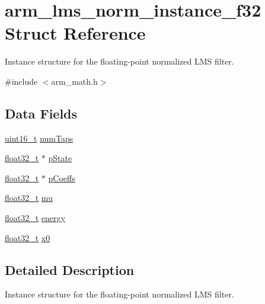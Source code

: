 \hypertarget{structarm__lms__norm__instance__f32}{\section{arm\-\_\-lms\-\_\-norm\-\_\-instance\-\_\-f32 Struct Reference}
\label{structarm__lms__norm__instance__f32}
}


Instance structure for the floating-\/point normalized L\-M\-S filter.  




{\ttfamily \#include $<$arm\-\_\-math.\-h$>$}

\subsection*{Data Fields}
\begin{DoxyCompactItemize}
\item 
\hyperlink{stdint_8h_a273cf69d639a59973b6019625df33e30}{uint16\-\_\-t} \hyperlink{structarm__lms__norm__instance__f32_ac95f8ca3d816524c2070643852fac5e8}{num\-Taps}
\item 
\hyperlink{arm__math_8h_a4611b605e45ab401f02cab15c5e38715}{float32\-\_\-t} $\ast$ \hyperlink{structarm__lms__norm__instance__f32_a0bc03338687002ed5f2e4a363eb095ec}{p\-State}
\item 
\hyperlink{arm__math_8h_a4611b605e45ab401f02cab15c5e38715}{float32\-\_\-t} $\ast$ \hyperlink{structarm__lms__norm__instance__f32_a1ba688d90aba7de003ed4ad8e2e7ddda}{p\-Coeffs}
\item 
\hyperlink{arm__math_8h_a4611b605e45ab401f02cab15c5e38715}{float32\-\_\-t} \hyperlink{structarm__lms__norm__instance__f32_a84401d3cfc6c40f69c08223cf341b886}{mu}
\item 
\hyperlink{arm__math_8h_a4611b605e45ab401f02cab15c5e38715}{float32\-\_\-t} \hyperlink{structarm__lms__norm__instance__f32_a6a4119e4f39447bbee31b066deafa16f}{energy}
\item 
\hyperlink{arm__math_8h_a4611b605e45ab401f02cab15c5e38715}{float32\-\_\-t} \hyperlink{structarm__lms__norm__instance__f32_aec958fe89b164a30f38bcca9f5d96218}{x0}
\end{DoxyCompactItemize}


\subsection{Detailed Description}
Instance structure for the floating-\/point normalized L\-M\-S filter. 

